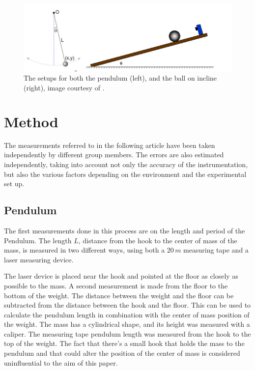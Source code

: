 \documentclass[a4paper,%
               aps,%
               prl,%
               amsfonts,%
               amssymb,%
               amsmath,%
               nobibnotes,%
               twocolumn, %
               twoside,%
               balancelastpage,%
               eqsecnum] %
               {revtex4-1}
\begin{document}
\begin{figure}[h]
\centering
\includegraphics[width=\linewidth]{setup12.PNG}
\caption{The setups for both the pendulum (left), and the ball on incline (right), image courtesy of \cite{setup}. \label{setupfig}}
\end{figure}

\section{Method}
The measurements referred to in the following article have been taken independently by different group members. The errors are also estimated independently, taking into account not only the accuracy of the instrumentation, but also the various factors depending on the environment and the experimental set up. 

\subsection{Pendulum}

The first measurements done in this process are on the length and period of the Pendulum. The length $L$, distance from the hook to the center of mass of the mass, is measured in two different ways, using both a $20 \, m$ measuring tape and a laser measuring device.

The laser device is placed near the hook and pointed at the floor as closely as possible to the mass.
A second measurement is made from the floor to the bottom of the weight.
The distance between the weight and the floor can be subtracted from the distance between the hook and the floor. This can be used to calculate the pendulum length in combination with the center of mass position of the weight.
The mass has a cylindrical shape, and its height was measured with a caliper.
The measuring tape pendulum length was measured from the hook to the top of the weight.
The fact that there's a small hook that holds the mass to the pendulum and that could alter the position of the center of mass is considered uninfluential to the aim of this paper.
\end{document}

